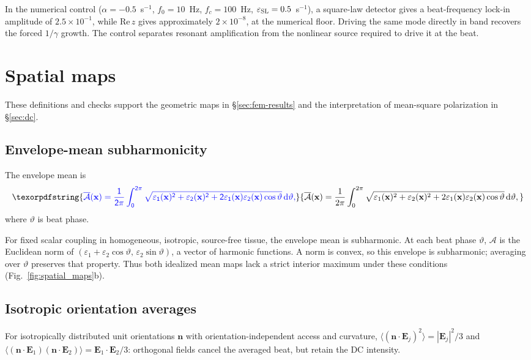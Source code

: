 \documentclass[11pt,a4paper]{article}
\newif\ifjne
\providecommand{\DIFaddtex}[1]{{\protect\color{blue} \sf #1}} %
\providecommand{\DIFadd}[1]{\texorpdfstring{\DIFaddtex{#1}}{#1}} %
\begin{document}
\DIFadd{In the numerical control ($\alpha=-0.5$~s$^{-1}$, $f_0=10$~Hz, $f_c=100$~Hz,
$\varepsilon_{\rm SL}=0.5$~s$^{-1}$), a square-law detector gives a beat-frequency lock-in amplitude
of $2.5\times10^{-1}$, while $\mathrm{Re}\,z$ gives approximately
$2\times10^{-8}$, at the numerical floor. Driving the same mode directly in band
recovers the forced $1/\gamma$ growth. The control separates resonant amplification
from the nonlinear source required to drive it at the beat.
}

\section{\DIFadd{Spatial maps}}\label{supp:spatial}
\DIFadd{These definitions and checks support the geometric maps in \S\ref{sec:fem-results}
and the interpretation of mean-square polarization in \S\ref{sec:dc}.
}\ifjne
\subsection{\DIFadd{Envelope-mean subharmonicity}}\label{supp:envelope-proof}
\DIFadd{The envelope mean is
}\[
\DIFadd{\overline{\mathcal A}(\mathbf x)=\frac{1}{2\pi}\int_0^{2\pi}
\sqrt{\varepsilon_1(\mathbf x)^2+\varepsilon_2(\mathbf x)^2
+2\varepsilon_1(\mathbf x)\varepsilon_2(\mathbf x)\cos\vartheta}\,\mathrm d\vartheta,
}\]
\DIFadd{where $\vartheta$ is beat phase.
}

\DIFadd{For fixed scalar coupling in homogeneous, isotropic, source-free tissue,
the envelope mean is subharmonic. At each beat phase $\vartheta$,
$\mathcal A$ is the Euclidean norm of
$(\varepsilon_1+\varepsilon_2\cos\vartheta,\,\varepsilon_2\sin\vartheta)$,
a vector of harmonic functions. A norm is convex, so this envelope is subharmonic;
averaging over $\vartheta$ preserves that property. Thus both idealized mean maps
lack a strict interior maximum under these conditions (Fig.~\ref{fig:spatial_maps}b).
}

\subsection{\DIFadd{Isotropic orientation averages}}\label{supp:orientation}
\DIFadd{For isotropically distributed unit orientations
$\mathbf n$ with orientation-independent access and curvature,
$\langle(\mathbf n\cdot\mathbf E_j)^2\rangle=|\mathbf E_j|^2/3$
and $\langle(\mathbf n\cdot\mathbf E_1)(\mathbf n\cdot\mathbf E_2)\rangle
=\mathbf E_1\cdot\mathbf E_2/3$: orthogonal fields cancel the averaged beat,
but retain the DC intensity.
}
\end{document}
